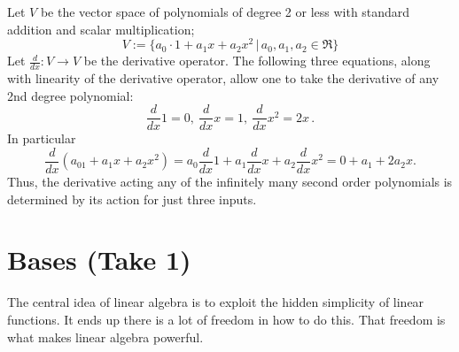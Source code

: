 \begin{example}
Let $V$ be the vector space of polynomials of degree 2 or less with standard addition and scalar multiplication;
\[
V := \{a_0\cdot1 + a_1x + a_2 x^2 \, | \,  a_0,a_1,a_2 \in \Re \}
\]
Let $\frac{d}{dx} \colon V\rightarrow V$ be \hypertarget{derivative_linear}{the derivative operator.}  
The following three equations, along with linearity of the derivative operator, allow one to take the derivative of any 2nd degree polynomial:
$$
\frac{d}{dx} 1=0,~\frac{d}{dx}x=1,~\frac{d}{dx}x^2=2x\,. 
$$
In particular
$$
\frac{d}{dx} (a_01 + a_1x + a_2 x^2) = 
 a_0\frac{d}{dx}1 + a_1 \frac{d}{dx} x + a_2 \frac{d}{dx} x^2  
 = 0+a_1+2a_2x.
$$
Thus, the derivative acting any of the infinitely many second order polynomials is determined by its action for just three inputs.

%
\end{example}


\section{Bases (Take 1)} 
The central idea of linear algebra is to exploit the hidden simplicity of linear functions. 
It ends up there is a lot of freedom in how to do this. That freedom is what makes linear algebra powerful.

